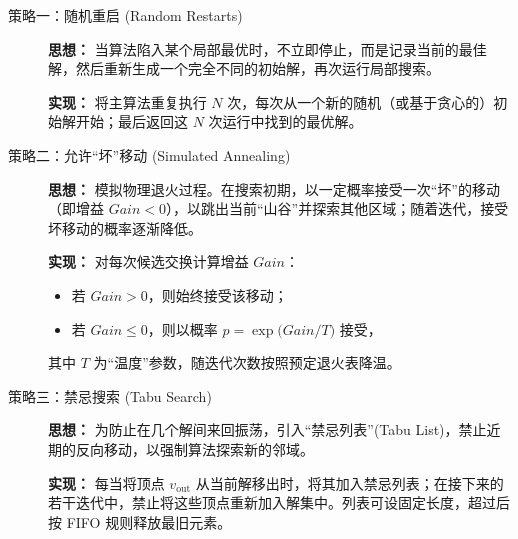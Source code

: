 \documentclass{article}
\begin{document}
\begin{description}
  \item[策略一：随机重启 (Random Restarts)]
  
  \textbf{思想：} 当算法陷入某个局部最优时，不立即停止，而是记录当前的最佳解，然后重新生成一个完全不同的初始解，再次运行局部搜索。  
  
  \textbf{实现：} 将主算法重复执行 \(N\) 次，每次从一个新的随机（或基于贪心的）初始解开始；最后返回这 \(N\) 次运行中找到的最优解。

  \item[策略二：允许“坏”移动 (Simulated Annealing)]
  
  \textbf{思想：} 模拟物理退火过程。在搜索初期，以一定概率接受一次“坏”的移动（即增益 \(Gain < 0\)），以跳出当前“山谷”并探索其他区域；随着迭代，接受坏移动的概率逐渐降低。  
  
  \textbf{实现：} 对每次候选交换计算增益 \(Gain\)：  
  \begin{itemize}
    \item 若 \(Gain > 0\)，则始终接受该移动；  
    \item 若 \(Gain \le 0\)，则以概率 \(p = \exp\bigl(Gain / T\bigr)\) 接受，  
  \end{itemize}
  其中 \(T\) 为“温度”参数，随迭代次数按照预定退火表降温。

  \item[策略三：禁忌搜索 (Tabu Search)]
  
  \textbf{思想：} 为防止在几个解间来回振荡，引入“禁忌列表”(Tabu List)，禁止近期的反向移动，以强制算法探索新的邻域。 
  
  \textbf{实现：} 每当将顶点 \(v_{\text{out}}\) 从当前解移出时，将其加入禁忌列表；在接下来的若干迭代中，禁止将这些顶点重新加入解集中。列表可设固定长度，超过后按 FIFO 规则释放最旧元素。
\end{description}
\end{document}

